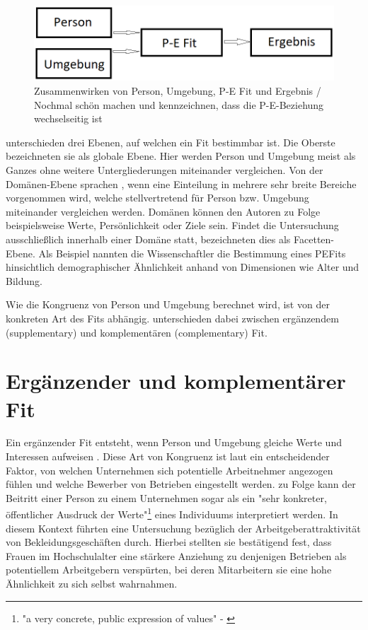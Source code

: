 \begin{figure}[h]
	\centering
	\includegraphics[width=1\textwidth]{gfx/P-E Fit.png}
	\caption{Zusammenwirken von Person, Umgebung, P-E Fit und Ergebnis / Nochmal schön machen und kennzeichnen, dass die P-E-Beziehung wechselseitig ist}
	\label{fig:personEnvironmentFit:einfuehrung:abb1}
\end{figure}
\newpage
\textcite[S. 6f.]{edwards:2007} unterschieden drei Ebenen, auf welchen ein Fit bestimmbar ist. Die Oberste bezeichneten sie als globale Ebene. Hier werden Person und Umgebung meist als Ganzes ohne weitere Untergliederungen miteinander vergleichen. Von der Domänen-Ebene sprachen \textcite[S. 7f.]{edwards:2007}, wenn eine Einteilung in mehrere sehr breite Bereiche vorgenommen wird, welche stellvertretend für Person bzw. Umgebung miteinander vergleichen werden. Domänen können den Autoren zu Folge beispielsweise Werte, Persönlichkeit oder Ziele sein. Findet die Untersuchung ausschließlich innerhalb einer Domäne statt, bezeichneten \textcite[S. 7f.]{edwards:2007} dies als Facetten-Ebene. Als Beispiel nannten die Wissenschaftler die Bestimmung eines \acp{PEFit} hinsichtlich demographischer Ähnlichkeit anhand von Dimensionen wie Alter und Bildung.

Wie die Kongruenz von Person und Umgebung berechnet wird, ist von der konkreten Art des Fits abhängig. \textcite[S. 1]{muchinsky:1987} unterschieden dabei zwischen ergänzendem (supplementary) und komplementären (complementary) Fit.

\section{Ergänzender und komplementärer Fit}
\label{ch:personEnvironmentFit:supplementaryUndComplementary}
Ein ergänzender Fit entsteht, wenn Person und Umgebung gleiche Werte und Interessen aufweisen \cite[S. 2f.]{muchinsky:1987}. Diese Art von Kongruenz ist laut \textcite[S. 1ff.]{schneider:1987} ein entscheidender Faktor, von welchen Unternehmen sich potentielle Arbeitnehmer angezogen fühlen und welche Bewerber von Betrieben eingestellt werden. \textcite[S. 4, Z. 25f.]{popovich:1982} zu Folge kann der Beitritt einer Person zu einem Unternehmen sogar als ein "sehr konkreter, öffentlicher Ausdruck der Werte"\footnote{"a very concrete, public expression of values" - \textcite[S. 4, Z. 25f.]{popovich:1982}} eines Individuums interpretiert werden. In diesem Kontext führten \textcite[S. 7]{devendorf:2008} eine Untersuchung bezüglich der Arbeitgeberattraktivität von Bekleidungsgeschäften durch. Hierbei stellten sie bestätigend fest, dass Frauen im Hochschulalter eine stärkere Anziehung zu denjenigen Betrieben als potentiellem Arbeitgebern verspürten, bei deren Mitarbeitern sie eine hohe Ähnlichkeit zu sich selbst wahrnahmen.

